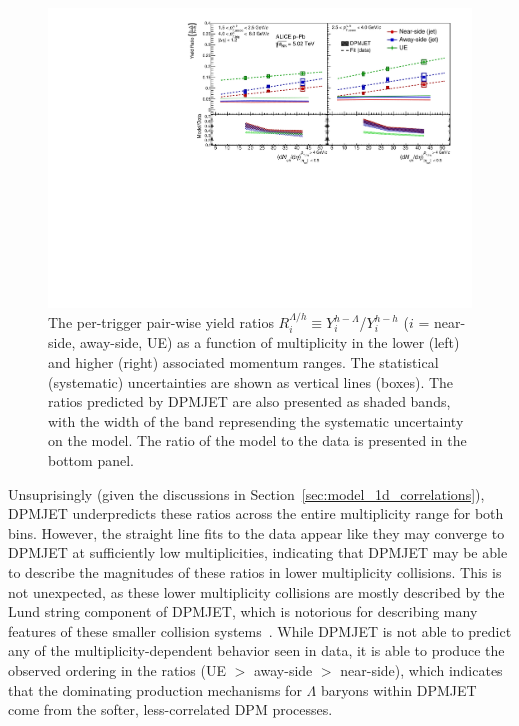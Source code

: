 \begin{figure}[h!]
\centering
\includegraphics[width=\textwidth]{figures/results/final_lambda_hadron_ratio_plot_new_x_axis_model_ratio.pdf}
\caption{The per-trigger pair-wise yield ratios $R_{i}^{\Lambda/h} \equiv Y_{i}^{h-\Lambda}$/$Y_{i}^{h-h}$ ($i$ = near-side, away-side, UE) as a function of multiplicity in the lower (left) and higher (right) associated momentum ranges. The statistical (systematic) uncertainties are shown as vertical lines (boxes). The ratios predicted by DPMJET are also presented as shaded bands, with the width of the band represending the systematic uncertainty on the model. The ratio of the model to the data is presented in the bottom panel.}
\label{fig:lambda_hadron_ratio_model}
\end{figure}

Unsuprisingly (given the discussions in Section~\ref{sec:model_1d_correlations}), DPMJET underpredicts these ratios across the entire multiplicity range for both \pt bins. However, the straight line fits to the data appear like they may converge to DPMJET at sufficiently low multiplicities, indicating that DPMJET may be able to describe the magnitudes of these ratios in lower multiplicity collisions. This is not unexpected, as these lower multiplicity collisions are mostly described by the Lund string component of DPMJET, which is notorious for describing many features of these smaller collision systems~\cite{Pythia}.  While DPMJET is not able to predict any of the multiplicity-dependent behavior seen in data, it is able to produce the observed ordering in the ratios (UE $>$ away-side $>$ near-side), which indicates that the dominating production mechanisms for $\Lambda$ baryons within DPMJET come from the softer, less-correlated DPM processes.

